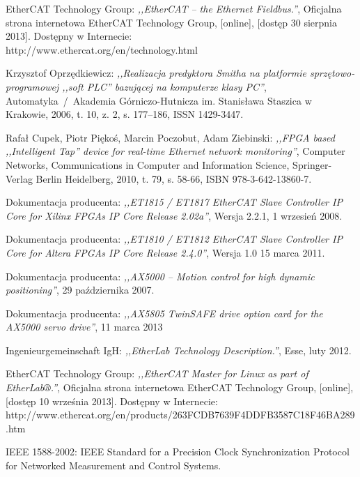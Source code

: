 \begin{thebibliography}{99}
EtherCAT Technology Group:
\emph{,,EtherCAT -- the Ethernet Fieldbus.''},
Oficjalna strona internetowa EtherCAT Technology Group,
[online],
[dostęp 30 sierpnia 2013].
Dostępny w Internecie: \\
http://www.ethercat.org/en/technology.html

Krzysztof Oprzędkiewicz:
\emph{,,Realizacja predyktora Smitha na platformie sprzętowo-programowej ,,soft PLC'' bazującej na komputerze klasy PC''},
Automatyka~/~Akademia Górniczo-Hutnicza im. Stanisława Staszica w Krakowie,
2006,
t. 10, z. 2, s. 177--186,
ISSN 1429-3447.

Rafał Cupek, Piotr Piękoś, Marcin Poczobut, Adam Ziebinski:
\emph{,,FPGA based ,,Intelligent Tap'' device for real-time Ethernet network monitoring''},
Computer Networks, Communications in Computer and Information Science, Springer-Verlag Berlin Heidelberg,
2010,
t. 79, s. 58-66,
ISBN 978-3-642-13860-7.

Dokumentacja producenta: 
\emph{,,ET1815 / ET1817 EtherCAT Slave Controller IP Core for Xilinx FPGAs IP Core Release 2.02a''}, 
Wersja 2.2.1,
1 wrzesień 2008.

Dokumentacja producenta: 
\emph{,,ET1810 / ET1812 EtherCAT Slave Controller IP Core for Altera FPGAs IP Core Release 2.4.0''}, 
Wersja 1.0
15 marca 2011.

Dokumentacja producenta: 
\emph{,,AX5000 – Motion control for high dynamic positioning''},
29 października 2007.

Dokumentacja producenta: 
\emph{,,AX5805 TwinSAFE drive option card for the AX5000 servo drive''},
11 marca 2013

Ingenieurgemeinschaft IgH:
\emph{,,EtherLab Technology Description.''},
Esse,
luty 2012.

EtherCAT Technology Group:
\emph{,,EtherCAT Master for Linux as part of EtherLab®.''},
Oficjalna strona internetowa EtherCAT Technology Group,
[online],
[dostęp 10 września 2013].
Dostępny w Internecie: \\
http://www.ethercat.org/en/products/263FCDB7639F4DDFB3587C18F46BA289.htm

IEEE 1588-2002: IEEE Standard for a Precision Clock Synchronization Protocol for Networked Measurement and Control Systems.


\end{thebibliography}